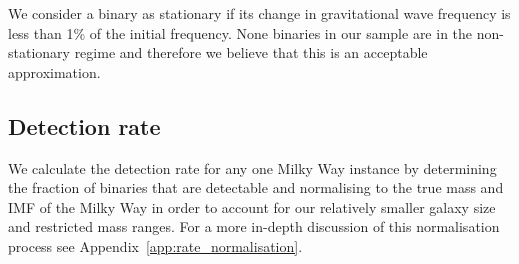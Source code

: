 We consider a binary as stationary if its change in gravitational wave frequency is less than 1\% of the initial frequency. None binaries in our sample are in the non-stationary regime and therefore we believe that this is an acceptable approximation.

\subsection{Detection rate}
We calculate the detection rate for any one Milky Way instance by determining the fraction of binaries that are detectable and normalising to the true mass and IMF of the Milky Way in order to account for our relatively smaller galaxy size and restricted mass ranges. For a more in-depth discussion of this normalisation process see Appendix~\ref{app:rate_normalisation}.